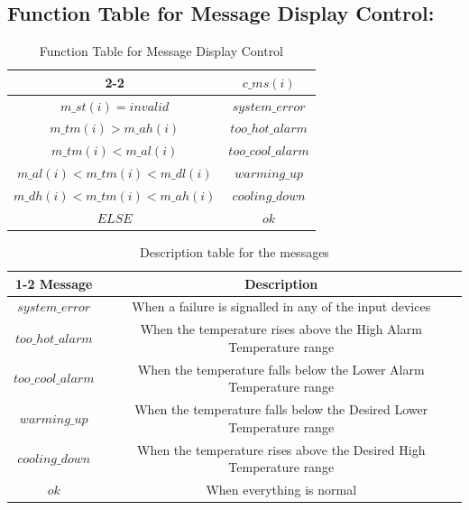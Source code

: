 \documentclass[fontsize=12pt,paper=letter,twoside]{scrartcl}
\begin{document}
\newpage
\subsection{Function Table for Message Display Control: }
\begin{table}[h]
\centering
\begin{tabular}{| c | c | }
	\cline{2-2}
	\multicolumn{1}{ c| }{ }& $c\_ms(i)$ \\ \hline
	$m\_st(i) = invalid $      &  $system\_error$ \\ \hline
	$m\_tm(i) > m\_ah(i) $  &  $too\_hot\_alarm$  \\ \hline
	$m\_tm(i) < m\_al(i) $   &   $too\_cool\_alarm$ \\ \hline
	$m\_al(i) < m\_tm(i) < m\_dl(i) $ & $warming\_up$ \\ \hline
	$m\_dh(i) < m\_tm(i) < m\_ah(i) $ & $cooling\_down$ \\ \hline
     $ELSE $ & $ok$ \\ \hline
\end{tabular}
\caption {Function Table for Message Display Control}
\label{tbl:ms}
\end{table}

\begin{table}[h]
\centering
\begin{tabular}{| c | c | }
	\cline{1-2}
	Message & Description \\ \hline
	$system\_error$ & When a failure is signalled in any of the input devices \\ \hline
	$too\_hot\_alarm$ & When the temperature rises above the High Alarm Temperature range \\ \hline
	$too\_cool\_alarm$ & When the temperature falls below the Lower Alarm Temperature range\\ \hline
	$warming\_up$ & When the temperature falls below the Desired Lower Temperature range\\ \hline
	$cooling\_down$ & When the temperature rises above the Desired High Temperature range\\ \hline
    $ok$ & When everything is normal\\ \hline
\end{tabular}
\caption {Description table for the messages}
\label{tbl:ms1}
\end{table}

\newpage
\end{document}
